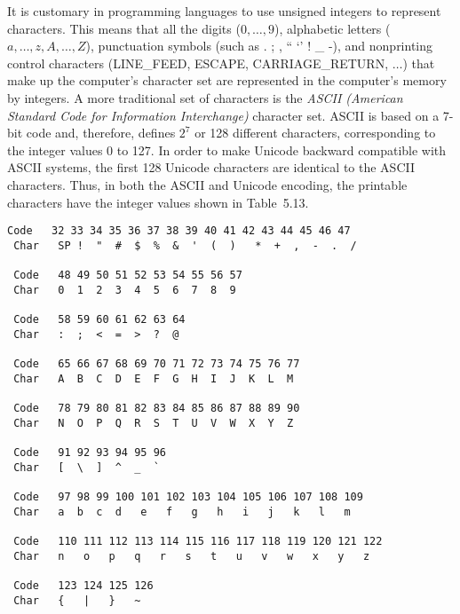 It is customary in programming languages to use unsigned integers to
represent characters.  This means that all the digits ($0, \dots,9$),
alphabetic letters ($a,\dots,z, A,\dots, Z$), punctuation symbols
(such as . ; , `` `' ! \_ -), and nonprinting control characters
(LINE\_FEED, ESCAPE, CARRIAGE\_RETURN, $\dots$) that make up the
computer's character set are represented in the computer's memory by
integers.  A more traditional set of characters is the {\it ASCII
(American Standard
Code for Information Interchange)} character set.  ASCII is based on a
7-bit code and, therefore, defines $2^7$ or 128 different characters,
corresponding to the integer values 0 to 127. In order to make Unicode
backward compatible with ASCII systems, the
first 128 Unicode characters are identical to the ASCII
characters.  Thus, in both the ASCII and Unicode encoding, the printable
characters have the integer values shown in Table~5.13.

\begin{table}[htb]
\begin{jjjlisting}
\begin{lstlisting}[stringstyle=\color{black}]
 Code   32 33 34 35 36 37 38 39 40 41 42 43 44 45 46 47
 Char   SP !  "  #  $  %  &  '  (  )   *  +  ,  -  .  /

 Code   48 49 50 51 52 53 54 55 56 57
 Char   0  1  2  3  4  5  6  7  8  9

 Code   58 59 60 61 62 63 64
 Char   :  ;  <  =  >  ?  @

 Code   65 66 67 68 69 70 71 72 73 74 75 76 77
 Char   A  B  C  D  E  F  G  H  I  J  K  L  M

 Code   78 79 80 81 82 83 84 85 86 87 88 89 90
 Char   N  O  P  Q  R  S  T  U  V  W  X  Y  Z

 Code   91 92 93 94 95 96
 Char   [  \  ]  ^  _  `

 Code   97 98 99 100 101 102 103 104 105 106 107 108 109
 Char   a  b  c  d   e   f   g   h   i   j   k   l   m

 Code   110 111 112 113 114 115 116 117 118 119 120 121 122
 Char   n   o   p   q   r   s   t   u   v   w   x   y   z

 Code   123 124 125 126
 Char   {   |   }   ~
\end{lstlisting}
\end{jjjlisting}
\end{table}

